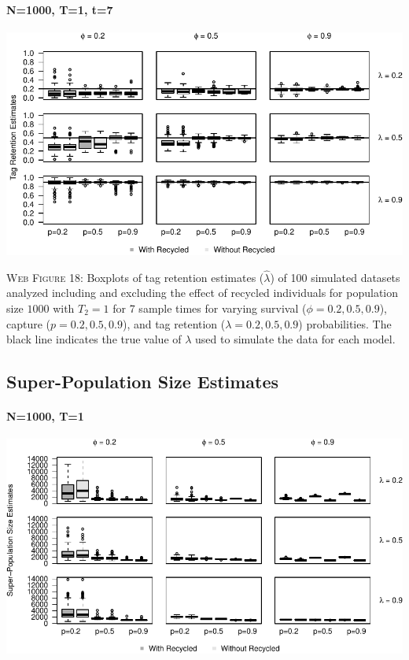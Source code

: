 \documentclass[]{article}
\let\oldparagraph\paragraph
\renewcommand{\paragraph}[1]{\oldparagraph{#1}\mbox{}}
\begin{document}
\paragraph{N=1000, T=1, t=7}\label{n1000-t1-t7-2}

\includegraphics{Appendix_BW_files/figure-latex/figure18_tagretention_GJSTL6-1.pdf}

\textsc{Web Figure 18:} Boxplots of tag retention estimates
(\(\hat{\lambda}\)) of 100 simulated datasets analyzed including and excluding
the effect of recycled individuals for population size \(1000\) with
\(T_2=1\) for 7 sample times for varying survival
(\(\phi=0.2,0.5,0.9\)), capture (\(p=0.2,0.5,0.9\)), and tag retention
(\(\lambda=0.2,0.5,0.9\)) probabilities. The black line indicates the
true value of \(\lambda\) used to simulate the data for each model.

\newpage

\subsection{Super-Population Size
Estimates}\label{super-population-size-estimates}

\paragraph{N=1000, T=1}\label{n1000-t1-3}

\includegraphics{Appendix_BW_files/figure-latex/figure19_superN_GJSTL1-1.pdf}
\end{document}

